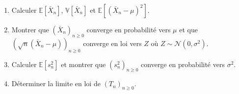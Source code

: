 \documentclass[a4paper,10pt,fleqn]{article}
\newcommand{\1}{\ensuremath{\mathbbm{1}}}
\begin{document}
\begin{enumerate}
\item Calculer $\mathbb{E}[\bar X_n]$, $\mathbb{V}[\bar X_n]$ et $\mathbb{E}[(\bar X_n-\mu)^2]$.

%

\item Montrer que $(\bar X_n)_{n\geq 0}$ converge en probabilit\'e vers $\mu$ et que $(\sqrt{n}(\bar X_n-\mu))_{n\geq 0}$  converge en loi vers $Z$ o\`u $ Z\sim \mathcal{N}(0,\sigma^2)$.

%

\item Calculer $\mathbb{E}[s^2_n]$ et montrer que $(s^2_n)_{n\geq 0}$ converge en probabilit\'e vers $\sigma^2$.

%

\item D\'eterminer la limite en loi de $(T_n)_{n\geq 0}$.

%


\end{enumerate}
\end{document}
